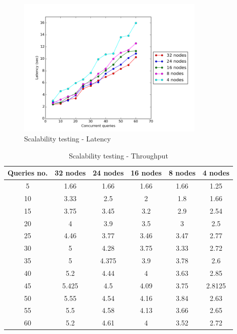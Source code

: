 \begin{figure}[H]
  \centering
  \includegraphics[width=0.8\textwidth]{figures/scalability_latency.png}
  \caption{Scalability testing - Latency}
\end{figure}



\begin{table}[H]
\begin{center}
\begin{tabular}{|c|c|c|c|c|c|}
\hline
Queries no. & 32 nodes & 24 nodes & 16 nodes & 8 nodes & 4 nodes \\ \hline
5 & 1.66   & 1.66  & 1.66 & 1.66 & 1.25\\ \hline
10 & 3.33  & 2.5   & 2    & 1.8  & 1.66\\ \hline
15 & 3.75  & 3.45  & 3.2  & 2.9  & 2.54\\ \hline
20 & 4     & 3.9   & 3.5  & 3    & 2.5\\ \hline
25 & 4.46  & 3.77  & 3.46 & 3.47 & 2.77\\ \hline
30 & 5     & 4.28  & 3.75 & 3.33 & 2.72\\ \hline
35 & 5     & 4.375 & 3.9  & 3.78 & 2.6 \\ \hline
40 & 5.2   & 4.44  & 4    & 3.63 & 2.85 \\ \hline
45 & 5.425 & 4.5   & 4.09 & 3.75 & 2.8125 \\ \hline
50 & 5.55  & 4.54  & 4.16 & 3.84 & 2.63 \\ \hline
55 & 5.5   & 4.58  & 4.13 & 3.66 & 2.65 \\ \hline
60 & 5.2   & 4.61  & 4    & 3.52 & 2.72 \\ \hline
\end{tabular}
\end{center}
\caption{Scalability testing - Throughput}
\end{table}

